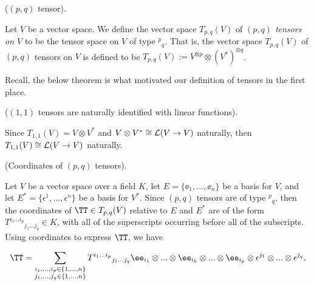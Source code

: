 \begin{defn}
    \label{ch::motivated_intro::defn::pq_tensor}
    
    ($(p, q)$ tensor).
    
    Let $V$ be a vector space. We define the vector space $T_{p,q}(V)$ of \textit{$(p, q)$ tensors on $V$} to be the tensor space on $V$ of type $^p{}_q$. That is, the vector space $T_{p,q}(V)$ of $(p, q)$ tensors on $V$ is defined to be $T_{p,q}(V) := V^{\otimes p} \otimes (V^*)^{\otimes q}$.
\end{defn}

Recall, the below theorem is what motivated our definition of tensors in the first place.

\begin{theorem}
    ($(1, 1)$ tensors are naturally identified with linear functions).
    
    Since $T_{1,1}(V) = V \otimes V^*$ and $V \otimes V^* \cong \mathcal{L}(V \rightarrow V)$ naturally, then $T_{1,1}(V) \cong \mathcal{L}(V \rightarrow V)$ naturally. 
\end{theorem}

\begin{theorem}
    (Coordinates of $(p, q)$ tensors).

    Let $V$ be a vector space over a field $K$, let $E = \{\ee_1, ..., \ee_n\}$ be a basis for $V$, and let $E^* = \{\epsilon^1, ..., \epsilon^n\}$ be a basis for $V^*$. Since $(p, q)$ tensors are of type $^p{}_q$, then the coordinates of $\TT \in T_{p,q}(V)$ relative to $E$ and $E^*$ are of the form $T^{i_1 ... i_p}{}_{j_1 ... j_q} \in K$, with all of the superscripts occurring before all of the subscripts. Using coordinates to express $\TT$, we have

     \begin{align*}
        \TT = \sum_{\substack{i_1, ..., i_p \in \{1, ..., n\} \\ j_1, ..., j_q \in \{1, ..., n\}}} T^{i_1 ... i_p}{}_{j_1 ... j_q} \ee_{i_1} \otimes ... \otimes \ee_{i_k} \otimes ... \otimes \ee_{i_p} \otimes \epsilon^{j_1} \otimes ... \otimes \epsilon^{j_q}.
    \end{align*}
\end{theorem}

